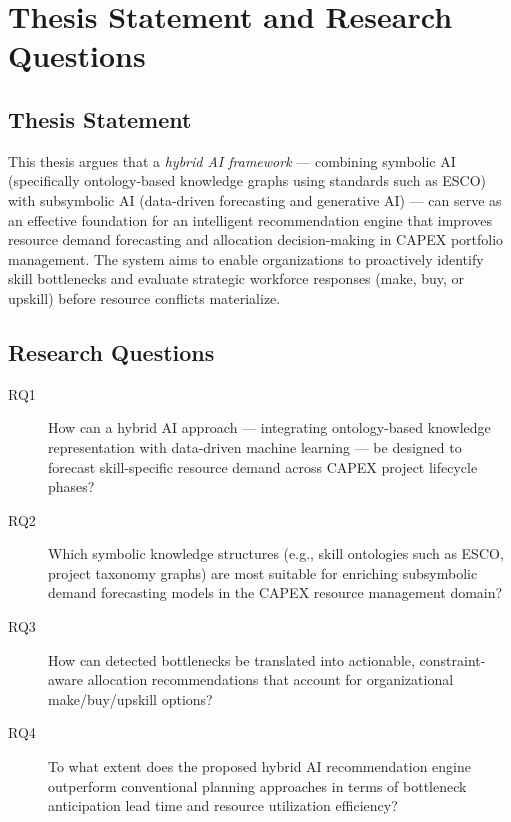 \chapter{Thesis Statement and Research Questions}
\label{chap:thesis_statement}

\section{Thesis Statement}
\label{sec:thesis_statement}

This thesis argues that a \textit{hybrid AI framework} — combining symbolic AI (specifically ontology-based knowledge graphs using standards such as ESCO) with subsymbolic AI (data-driven forecasting and generative AI) — can serve as an effective foundation for an intelligent recommendation engine that improves resource demand forecasting and allocation decision-making in CAPEX portfolio management. The system aims to enable organizations to proactively identify skill bottlenecks and evaluate strategic workforce responses (make, buy, or upskill) before resource conflicts materialize.

\section{Research Questions}
\label{sec:research_questions}

\begin{description}
  \item[RQ1] How can a hybrid AI approach — integrating ontology-based knowledge representation with data-driven machine learning — be designed to forecast skill-specific resource demand across CAPEX project lifecycle phases?

  \item[RQ2] Which symbolic knowledge structures (e.g., skill ontologies such as ESCO, project taxonomy graphs) are most suitable for enriching subsymbolic demand forecasting models in the CAPEX resource management domain?

  \item[RQ3] How can detected bottlenecks be translated into actionable, constraint-aware allocation recommendations that account for organizational make/buy/upskill options?

  \item[RQ4] To what extent does the proposed hybrid AI recommendation engine outperform conventional planning approaches in terms of bottleneck anticipation lead time and resource utilization efficiency?
\end{description}

